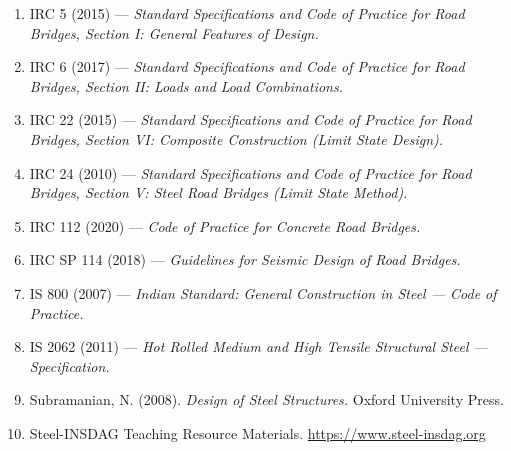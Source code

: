 \documentclass[12pt,a4paper]{report}
\numberwithin{table}{chapter}
\numberwithin{figure}{chapter}
\begin{document}
\begin{enumerate}

\item IRC 5 (2015) --- \textit{Standard Specifications and Code of Practice for Road Bridges, Section I: General Features of Design.}

\item IRC 6 (2017) --- \textit{Standard Specifications and Code of Practice for Road Bridges, Section II: Loads and Load Combinations.}

\item IRC 22 (2015) --- \textit{Standard Specifications and Code of Practice for Road Bridges, Section VI: Composite Construction (Limit State Design).}

\item IRC 24 (2010) --- \textit{Standard Specifications and Code of Practice for Road Bridges, Section V: Steel Road Bridges (Limit State Method).}

\item IRC 112 (2020) --- \textit{Code of Practice for Concrete Road Bridges.}

\item IRC SP 114 (2018) --- \textit{Guidelines for Seismic Design of Road Bridges.}

\item IS 800 (2007) --- \textit{Indian Standard: General Construction in Steel --- Code of Practice.}

\item IS 2062 (2011) --- \textit{Hot Rolled Medium and High Tensile Structural Steel --- Specification.}

\item Subramanian, N. (2008). \textit{Design of Steel Structures.} Oxford University Press.

\item Steel-INSDAG Teaching Resource Materials. \url{https://www.steel-insdag.org}

\end{enumerate}
\end{document}
